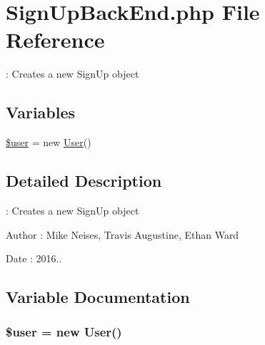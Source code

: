 \hypertarget{_sign_up_back_end_8php}{}\section{Sign\+Up\+Back\+End.\+php File Reference}
\label{_sign_up_back_end_8php}


\+: Creates a new Sign\+Up object  


\subsection*{Variables}
\begin{DoxyCompactItemize}
\item 
\hyperlink{_sign_up_back_end_8php_a598ca4e71b15a1313ec95f0df1027ca5}{\$user} = new \hyperlink{class_user}{User}()
\end{DoxyCompactItemize}


\subsection{Detailed Description}
\+: Creates a new Sign\+Up object 

\begin{DoxyAuthor}{Author}
\+: Mike Neises, Travis Augustine, Ethan Ward 
\end{DoxyAuthor}
\begin{DoxyDate}{Date}
\+: 2016.. 
\end{DoxyDate}


\subsection{Variable Documentation}
\subsubsection[{\texorpdfstring{\$user}{$user}}]{\setlength{\rightskip}{0pt plus 5cm}\$user = new {\bf User}()}\hypertarget{_sign_up_back_end_8php_a598ca4e71b15a1313ec95f0df1027ca5}{}\label{_sign_up_back_end_8php_a598ca4e71b15a1313ec95f0df1027ca5}
